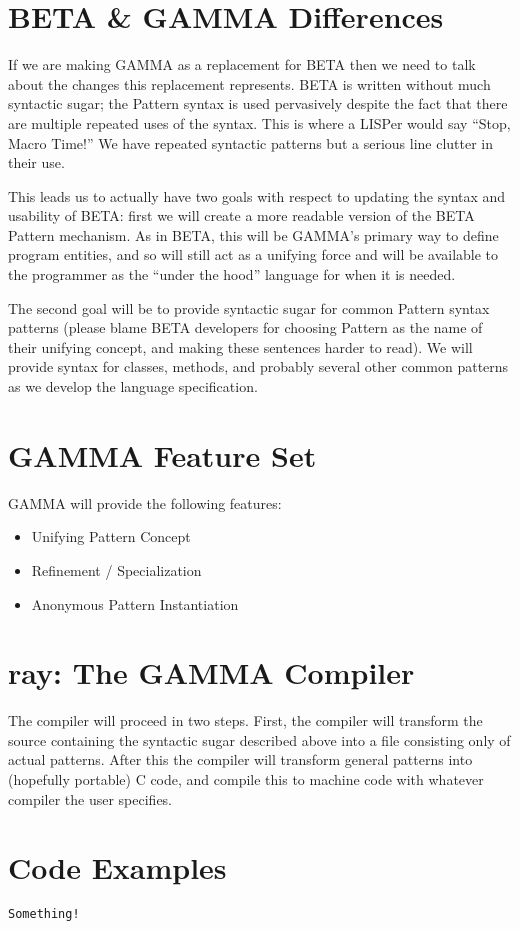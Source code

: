 \documentclass[10pt]{article}
\newcommand{\Lang}{GAMMA}
\newcommand{\Compiler}{ray}
\newcommand{\OLang}{BETA}
\begin{document}
\section*{\OLang{} \& \Lang{} Differences}
If we are making \Lang{} as a replacement for \OLang{} then we need to talk
about the changes this replacement represents. \OLang{} is written without
much syntactic sugar; the Pattern syntax is used pervasively despite the
fact that there are multiple repeated uses of the syntax. This is where a
LISPer would say ``Stop, Macro Time!'' We have repeated syntactic patterns
but a serious line clutter in their use.

This leads us to actually have two goals with respect to updating the syntax
and usability of \OLang{}: first we will create a more readable version of
the \OLang{} Pattern mechanism. As in \OLang, this will be \Lang{}'s primary
way to define program entities, and so will still act as a unifying force
and will be available to the programmer as the ``under the hood'' language
for when it is needed.

The second goal will be to provide syntactic sugar for common Pattern syntax
patterns (please blame \OLang{} developers for choosing Pattern as the name
of their unifying concept, and making these sentences harder to read). We will
provide syntax for classes, methods, and probably several other common patterns
as we develop the language specification.

\section*{\Lang{} Feature Set}

\Lang{} will provide the following features:

\begin{itemize}
\item Unifying Pattern Concept
\item Refinement / Specialization
\item Anonymous Pattern Instantiation
\end{itemize}

\section*{\Compiler{}: The \Lang{} Compiler}

The compiler will proceed in two steps. First, the compiler will transform
the source containing the syntactic sugar described above into a file
consisting only of actual patterns. After this the compiler will transform
general patterns into (hopefully portable) C code, and compile this to
machine code with whatever compiler the user specifies.

\section*{Code Examples}
\begin{lstlisting}[label=some-code,caption=Some Code]
Something!
\end{lstlisting}
\end{document}
